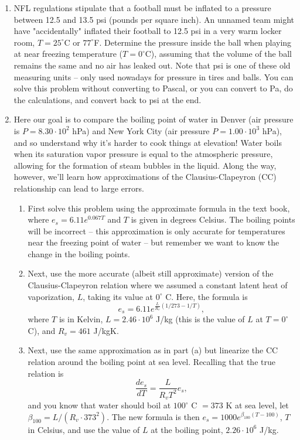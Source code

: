 \documentclass[letterpaper, 11pt]{article}
\newcommand{\1}{\mathds{1}}	%
\theoremstyle{definition}
\begin{document}
\begin{enumerate}[leftmargin=*, label=\arabic*.]

  \item NFL regulations stipulate that a football must be inflated to a pressure between 12.5 and 13.5 psi (pounds per square inch). An unnamed team might have "accidentally" inflated their football to 12.5 psi in a very warm locker room, $T = 25^\circ$C or $77^\circ$F. Determine the pressure inside the ball when playing at near freezing temperature ($T = 0^\circ$C), assuming that the volume of the ball remains the same and no air has leaked out. Note that psi is one of these old measuring units -- only used nowadays for pressure in tires and balls. You can solve this problem without converting to Pascal, or you can convert to Pa, do the calculations, and convert back to psi at the end.

  \item Here our goal is to compare the boiling point of water in Denver (air pressure is $P = 8.30 \cdot 10^2$ hPa) and New York City (air pressure $P = 1.00 \cdot 10^3$ hPa), and so understand why it's harder to cook things at elevation! Water boils when its saturation vapor pressure is equal to the atmospheric pressure, allowing for the formation of steam bubbles in the liquid. Along the way, however, we'll learn how approximations of the Clausius-Clapeyron (CC) relationship can lead to large errors.

  \begin{enumerate}[label=(\alph*)]
    \item First solve this problem using the approximate formula in the text book, where $e_s = 6.11e^{0.067T}$ and $T$ is given in degrees Celsius. The boiling points will be incorrect -- this approximation is only accurate for temperatures near the freezing point of water -- but remember we want to know the change in the boiling points.
    
    \item Next, use the more accurate (albeit still approximate) version of the Clausius-Clapeyron relation where we assumed a constant latent heat of vaporization, $L$, taking its value at $0^\circ$ C. Here, the formula is
    \[
      e_s = 6.11e^{\frac{L}{R_v}(1/273-1/T)},
    \]
    where $T$ is in Kelvin, $L = 2.46 \cdot 10^6$ J/kg (this is the value of $L$ at $T = 0^\circ$ C), and $R_v = 461$ J/kgK.

    \item Next, use the same approximation as in part (a) but linearize the CC relation around the boiling point at sea level. Recalling that the true relation is
    \[
      \frac{de_s}{dT} = \frac{L}{R_v T^2}e_s,
    \]
    and you know that water should boil at $100^\circ$ C $= 373$ K at sea level, let $\beta_{100} = L/(R_v \cdot 373^2)$. The new formula is then $e_s = 1000e^{\beta_{100}(T-100)}$, $T$ in Celsius, and use the value of $L$ at the boiling point, $2.26 \cdot 10^6$ J/kg.


\end{enumerate}
\end{enumerate}
\end{document}
